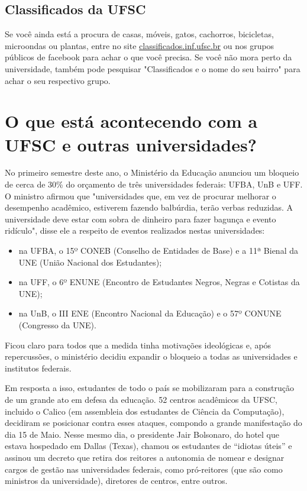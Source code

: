 \documentclass{article}
\begin{document}
\subsection{Classificados da UFSC}
Se você ainda está a procura de casas, móveis, gatos, cachorros, bicicletas, microondas ou plantas, entre no site \url{classificados.inf.ufsc.br}
ou nos grupos públicos de facebook para achar o que você precisa. Se você não mora perto da universidade, também pode pesquisar "Classificados e o nome do seu bairro"  para achar o seu respectivo grupo.

\section{O que está acontecendo com a UFSC e outras universidades?}
No primeiro semestre deste ano, o Ministério da Educação anunciou um bloqueio de cerca de 30\% do orçamento de três universidades federais: UFBA, UnB e UFF. O ministro afirmou que "universidades que, em vez de procurar melhorar o desempenho acadêmico, estiverem fazendo balbúrdia, terão verbas reduzidas. A universidade deve estar com sobra de dinheiro para fazer bagunça e evento ridículo", disse ele a respeito de eventos realizados nestas universidades:
\begin{itemize}
\item na UFBA, o 15º CONEB (Conselho de Entidades de Base) e a 11ª Bienal da UNE (União Nacional dos Estudantes);
\item na UFF, o 6º ENUNE (Encontro de Estudantes Negros, Negras e Cotistas da UNE);
\item na UnB, o III ENE (Encontro Nacional da Educação) e o 57º CONUNE (Congresso da UNE).
\end{itemize}
Ficou claro para todos que a medida tinha motivações ideológicas e, após repercussões, o ministério decidiu expandir o bloqueio a todas as universidades e institutos federais.

Em resposta a isso, estudantes de todo o país se mobilizaram para a construção de um grande ato em defesa da educação. 52 centros acadêmicos da UFSC, incluido o Calico (em assembleia dos estudantes de Ciência da Computação), decidiram se posicionar contra esses ataques, compondo a grande manifestação do dia 15 de Maio. Nesse mesmo dia, o presidente Jair Bolsonaro, do hotel que estava hospedado em Dallas (Texas), chamou os estudantes de “idiotas úteis” e assinou um decreto que retira dos reitores a autonomia de nomear e designar cargos de gestão nas universidades federais, como pró-reitores (que são como ministros da universidade), diretores de centros, entre outros.
\end{document}
